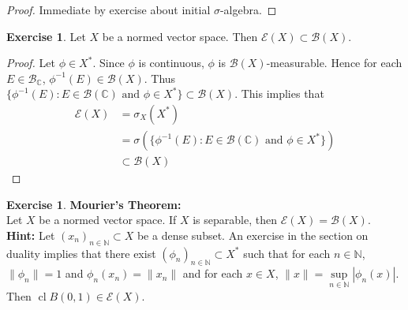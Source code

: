 \documentclass{book}
\theoremstyle{definition}
\newtheorem{ex}[definition]{Exercise}
\newcommand{\sig}{\sigma}
\newcommand{\C}{\mathbb{C}}
\newcommand{\N}{\mathbb{N}}
\newcommand{\MB}{\mathcal{B}}
\newcommand{\ME}{\mathcal{E}}
\DeclareMathOperator{\cl}{cl}
\DeclareMathOperator*{\0}{\mbf{0}}
\DeclareMathOperator*{\1}{\mbf{1}}
\begin{document}
	\begin{proof}
		Immediate by exercise about initial $\sig$-algebra.
	\end{proof}
	
	\begin{ex}
		Let $X$ be a normed vector space. Then $\ME(X) \subset \MB(X)$.
	\end{ex}
	
	\begin{proof}
		Let $\phi \in X^*$. Since $\phi$ is continuous, $\phi$ is $\MB(X)$-measurable. Hence for each $E \in \MB_{\C}$, $\phi^{-1}(E) \in \MB(X)$. Thus $\{ \phi^{-1}(E) : E \in \MB(\C) \text{ and } \phi \in X^* \} \subset \MB(X)$.  This implies that 
		\begin{align*}
			\ME(X) 
			& = \sig_X(X^*) \\
			& = \sig(\{ \phi^{-1}(E):E \in \MB(\C) \text{ and } \phi \in X^* \}) \\
			& \subset \MB(X) 
		\end{align*} 
	\end{proof}
	
	\begin{ex} \textbf{Mourier's Theorem:} \\
		Let $X$ be a normed vector space. If $X$ is separable, then $\ME(X) = \MB(X)$. \\
		\textbf{Hint:} Let $(x_n)_{n \in \N} \subset X$ be a dense subset. An exercise in the section on duality implies that there exist $(\phi_n)_{n \in \N} \subset X^*$ such that for each $n \in \N$, $\|\phi_n\| = 1$ and $\phi_n(x_n) = \|x_n\|$ and for each $x \in X$, $\|x\| = \sup\limits_{n \in \N} |\phi_n(x)|$. Then $ \cl B(0, 1) \in \ME(X)$.  
	\end{ex}
	
\end{document}
